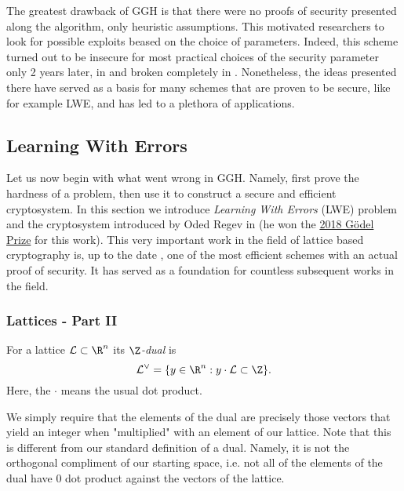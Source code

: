 The greatest drawback of GGH is that there were no proofs of security presented along the algorithm, only heuristic assumptions. This motivated researchers to look for possible exploits beased on the choice of parameters. Indeed, this scheme turned out to be insecure for most practical choices of the security parameter only 2 years later, in \cite{break1} and broken completely in \cite{break2}. Nonetheless, the ideas presented there have served as a basis for many schemes that are proven to be secure, like for example LWE, and has led to a plethora of applications.
\subsection{Learning With Errors}
Let us now begin with what went wrong in GGH. Namely, first prove the hardness of a problem, then use it to construct a secure and efficient cryptosystem. In this section we introduce \textit{Learning With Errors} (LWE) problem and the cryptosystem introduced by Oded Regev in \cite{regev} (he won the \href{https://eatcs.org/index.php/component/content/article/1-news/2670-2018-godel-prize}{2018 Gödel Prize} for this work). This very important work in the field of lattice based cryptography is, up to the date , one of the most efficient schemes with an actual proof of security. It has served as a foundation for countless subsequent works in the field. 

\iffalse
\subsubsection*{Lattices - Part II}

\begin{definition}[Dual]
    For a lattice $\mathcal{L} \subset \R^n$ its $\Z$\textit{-dual} is
    $$ \mathcal{L}^{\vee} = \{ y \in \R^n : y \cdot \mathcal{L} \subset \Z \}.$$
    Here, the $\cdot$ means the usual dot product.
\end{definition}

We simply require that the elements of the dual are precisely those vectors that yield an integer when "multiplied" with an element of our lattice. Note that this is different from our standard definition of a dual. Namely, it is not the orthogonal compliment of our starting space, i.e. not all of the elements of the dual have 0 dot product against the vectors of the lattice.

